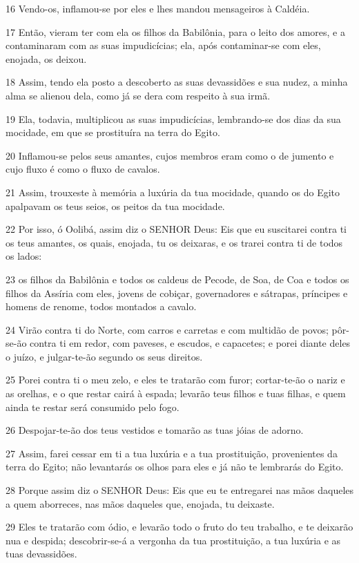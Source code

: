 \par 16 Vendo-os, inflamou-se por eles e lhes mandou mensageiros à Caldéia.
\par 17 Então, vieram ter com ela os filhos da Babilônia, para o leito dos amores, e a contaminaram com as suas impudicícias; ela, após contaminar-se com eles, enojada, os deixou.
\par 18 Assim, tendo ela posto a descoberto as suas devassidões e sua nudez, a minha alma se alienou dela, como já se dera com respeito à sua irmã.
\par 19 Ela, todavia, multiplicou as suas impudicícias, lembrando-se dos dias da sua mocidade, em que se prostituíra na terra do Egito.
\par 20 Inflamou-se pelos seus amantes, cujos membros eram como o de jumento e cujo fluxo é como o fluxo de cavalos.
\par 21 Assim, trouxeste à memória a luxúria da tua mocidade, quando os do Egito apalpavam os teus seios, os peitos da tua mocidade.
\par 22 Por isso, ó Oolibá, assim diz o SENHOR Deus: Eis que eu suscitarei contra ti os teus amantes, os quais, enojada, tu os deixaras, e os trarei contra ti de todos os lados:
\par 23 os filhos da Babilônia e todos os caldeus de Pecode, de Soa, de Coa e todos os filhos da Assíria com eles, jovens de cobiçar, governadores e sátrapas, príncipes e homens de renome, todos montados a cavalo.
\par 24 Virão contra ti do Norte, com carros e carretas e com multidão de povos; pôr-se-ão contra ti em redor, com paveses, e escudos, e capacetes; e porei diante deles o juízo, e julgar-te-ão segundo os seus direitos.
\par 25 Porei contra ti o meu zelo, e eles te tratarão com furor; cortar-te-ão o nariz e as orelhas, e o que restar cairá à espada; levarão teus filhos e tuas filhas, e quem ainda te restar será consumido pelo fogo.
\par 26 Despojar-te-ão dos teus vestidos e tomarão as tuas jóias de adorno.
\par 27 Assim, farei cessar em ti a tua luxúria e a tua prostituição, provenientes da terra do Egito; não levantarás os olhos para eles e já não te lembrarás do Egito.
\par 28 Porque assim diz o SENHOR Deus: Eis que eu te entregarei nas mãos daqueles a quem aborreces, nas mãos daqueles que, enojada, tu deixaste.
\par 29 Eles te tratarão com ódio, e levarão todo o fruto do teu trabalho, e te deixarão nua e despida; descobrir-se-á a vergonha da tua prostituição, a tua luxúria e as tuas devassidões.
